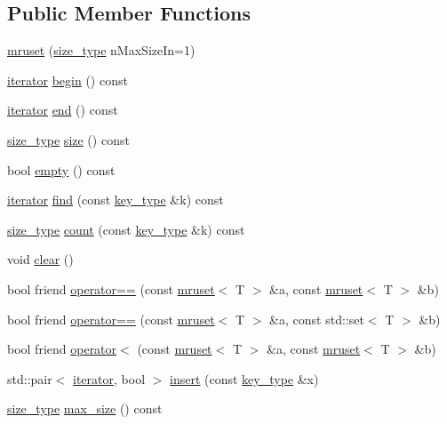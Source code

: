 \subsection*{Public Member Functions}
\begin{DoxyCompactItemize}
\item 
\mbox{\hyperlink{classmruset_a4474efd660e16337f91860587e369515}{mruset}} (\mbox{\hyperlink{classmruset_aaee46af18d8a5bdc503e9570e499a335}{size\+\_\+type}} n\+Max\+Size\+In=1)
\item 
\mbox{\hyperlink{classmruset_a246172eda1afff45be47a013c14b1ad6}{iterator}} \mbox{\hyperlink{classmruset_a778f8d3dc53ce8e76abb2f88ab42b3ad}{begin}} () const
\item 
\mbox{\hyperlink{classmruset_a246172eda1afff45be47a013c14b1ad6}{iterator}} \mbox{\hyperlink{classmruset_ac93f008bbc701f8c9512f6f1d8ae1d24}{end}} () const
\item 
\mbox{\hyperlink{classmruset_aaee46af18d8a5bdc503e9570e499a335}{size\+\_\+type}} \mbox{\hyperlink{classmruset_a9b1cd4454d0399085c4ec9ddb8611011}{size}} () const
\item 
bool \mbox{\hyperlink{classmruset_a94f290b3990c91c3606ab11935cee849}{empty}} () const
\item 
\mbox{\hyperlink{classmruset_a246172eda1afff45be47a013c14b1ad6}{iterator}} \mbox{\hyperlink{classmruset_abe8cc5d73bc6efad0bdaf4fa51bcc362}{find}} (const \mbox{\hyperlink{classmruset_a282941ee7f0438b0c09274b10c78cda0}{key\+\_\+type}} \&k) const
\item 
\mbox{\hyperlink{classmruset_aaee46af18d8a5bdc503e9570e499a335}{size\+\_\+type}} \mbox{\hyperlink{classmruset_aff65b732aed809fb84542e1136321a24}{count}} (const \mbox{\hyperlink{classmruset_a282941ee7f0438b0c09274b10c78cda0}{key\+\_\+type}} \&k) const
\item 
void \mbox{\hyperlink{classmruset_ac7a85b54646e9d9d1962ce7f30b2a1fc}{clear}} ()
\item 
bool friend \mbox{\hyperlink{classmruset_aced009504f86176bd82426aa24a38e37}{operator==}} (const \mbox{\hyperlink{classmruset}{mruset}}$<$ T $>$ \&a, const \mbox{\hyperlink{classmruset}{mruset}}$<$ T $>$ \&b)
\item 
bool friend \mbox{\hyperlink{classmruset_a4d7231441276ef8a6c0fa3edf9712f5c}{operator==}} (const \mbox{\hyperlink{classmruset}{mruset}}$<$ T $>$ \&a, const std\+::set$<$ T $>$ \&b)
\item 
bool friend \mbox{\hyperlink{classmruset_a5a95239f76da8ba675ba748baf1f07c8}{operator$<$}} (const \mbox{\hyperlink{classmruset}{mruset}}$<$ T $>$ \&a, const \mbox{\hyperlink{classmruset}{mruset}}$<$ T $>$ \&b)
\item 
std\+::pair$<$ \mbox{\hyperlink{classmruset_a246172eda1afff45be47a013c14b1ad6}{iterator}}, bool $>$ \mbox{\hyperlink{classmruset_af2e0dfe9d8b029bde78457797cdc42a9}{insert}} (const \mbox{\hyperlink{classmruset_a282941ee7f0438b0c09274b10c78cda0}{key\+\_\+type}} \&x)
\item 
\mbox{\hyperlink{classmruset_aaee46af18d8a5bdc503e9570e499a335}{size\+\_\+type}} \mbox{\hyperlink{classmruset_af33f9531e47639e4dc6a42c123797292}{max\+\_\+size}} () const
\end{DoxyCompactItemize}
